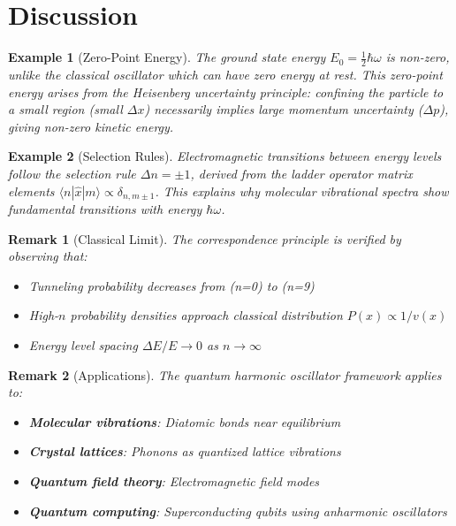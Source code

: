 \documentclass[a4paper, 11pt]{article}
\newtheorem{example}{Example}[section]
\newtheorem{remark}{Remark}[section]
\begin{document}
\section{Discussion}

\begin{example}[Zero-Point Energy]
The ground state energy $E_0 = \frac{1}{2}\hbar\omega$ is non-zero, unlike the classical
oscillator which can have zero energy at rest. This zero-point energy arises from the
Heisenberg uncertainty principle: confining the particle to a small region (small $\Delta x$)
necessarily implies large momentum uncertainty ($\Delta p$), giving non-zero kinetic energy.
\end{example}

\begin{example}[Selection Rules]
Electromagnetic transitions between energy levels follow the selection rule $\Delta n = \pm 1$,
derived from the ladder operator matrix elements $\langle n|\hat{x}|m\rangle \propto \delta_{n,m\pm 1}$.
This explains why molecular vibrational spectra show fundamental transitions with energy $\hbar\omega$.
\end{example}

\begin{remark}[Classical Limit]
The correspondence principle is verified by observing that:
\begin{itemize}
\item Tunneling probability decreases from  (n=0) to
       (n=9)
\item High-$n$ probability densities approach classical distribution $P(x) \propto 1/v(x)$
\item Energy level spacing $\Delta E/E \to 0$ as $n \to \infty$
\end{itemize}
\end{remark}

\begin{remark}[Applications]
The quantum harmonic oscillator framework applies to:
\begin{itemize}
\item \textbf{Molecular vibrations}: Diatomic bonds near equilibrium
\item \textbf{Crystal lattices}: Phonons as quantized lattice vibrations
\item \textbf{Quantum field theory}: Electromagnetic field modes
\item \textbf{Quantum computing}: Superconducting qubits using anharmonic oscillators
\end{itemize}
\end{remark}
\end{document}

